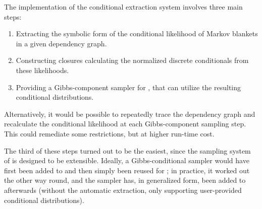 The implementation of the conditional extraction system involves three main steps:
\begin{enumerate}
  \firmlist
\item Extracting the symbolic form of the conditional likelihood of Markov blankets in a given
  dependency graph.
\item Constructing closures calculating the normalized discrete conditionals from these likelihoods.
\item Providing a Gibbs-component sampler for \turingjl{}, that can utilize the resulting
  conditional distributions.
\end{enumerate}
Alternatively, it would be possible to repeatedly trace the dependency graph and recalculate the
conditional likelihood at each Gibbs-component sampling step.  This could remediate some
restrictions, but at higher run-time cost.

The third of these steps turned out to be the easiest, since the sampling system of \turingjl{} is
designed to be extensible.  Ideally, a Gibbs-conditional sampler would have first been added to
\turingjl{} and then simply been reused for \autogibbsjl{}; in practice, it worked out the other way
round, and the \autogibbsjl{} sampler has, in generalized form, been added to \turingjl{} afterwards
(without the automatic extraction, only supporting user-provided conditional distributions).

